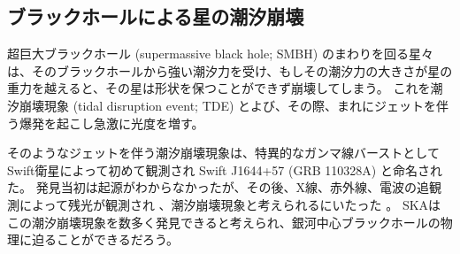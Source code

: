 \subsection{ブラックホールによる星の潮汐崩壊} \label{transients.s1.tde}
超巨大ブラックホール (supermassive black hole; SMBH) のまわりを回る星々は、そのブラックホールから強い潮汐力を受け、もしその潮汐力の大きさが星の重力を越えると、その星は形状を保つことができず崩壊してしまう。
これを潮汐崩壊現象 (tidal disruption event; TDE) とよび、その際、まれにジェットを伴う爆発を起こし急激に光度を増す。

そのようなジェットを伴う潮汐崩壊現象は、特異的なガンマ線バーストとしてSwift衛星によって初めて観測され Swift J1644+57 (GRB 110328A) と命名された。
発見当初は起源がわからなかったが、その後、X線、赤外線、電波の追観測によって残光が観測され \citep{2011Sci...333..199L}、潮汐崩壊現象と考えられるにいたった \citep{2011Sci...333..203B}。
SKAはこの潮汐崩壊現象を数多く発見できると考えられ、銀河中心ブラックホールの物理に迫ることができるだろう。

